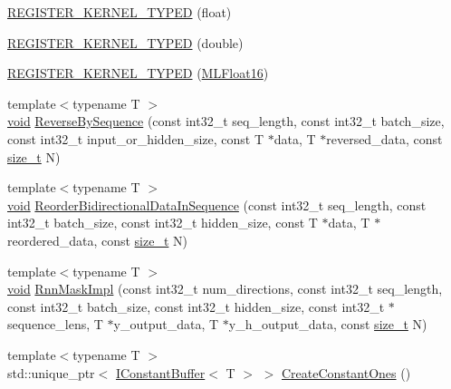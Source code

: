 \begin{DoxyCompactItemize}
\item 
\mbox{\hyperlink{namespaceonnxruntime_1_1cuda_af003050f5b8619b8e14ded14ba00da08}{R\+E\+G\+I\+S\+T\+E\+R\+\_\+\+K\+E\+R\+N\+E\+L\+\_\+\+T\+Y\+P\+ED}} (float)
\item 
\mbox{\hyperlink{namespaceonnxruntime_1_1cuda_a5d1b624b414dba6dec6a829ce2442d5a}{R\+E\+G\+I\+S\+T\+E\+R\+\_\+\+K\+E\+R\+N\+E\+L\+\_\+\+T\+Y\+P\+ED}} (double)
\item 
\mbox{\hyperlink{namespaceonnxruntime_1_1cuda_a42cc720b053b6d4b0cd5fac89629e977}{R\+E\+G\+I\+S\+T\+E\+R\+\_\+\+K\+E\+R\+N\+E\+L\+\_\+\+T\+Y\+P\+ED}} (\mbox{\hyperlink{uniononnxruntime_1_1MLFloat16}{M\+L\+Float16}})
\item 
{\footnotesize template$<$typename T $>$ }\\\mbox{\hyperlink{mlasi_8h_a88f941d423cb2a819b70a1358982b1a6}{void}} \mbox{\hyperlink{namespaceonnxruntime_1_1cuda_a50c0e5c797779509d0ec1d12b475f238}{Reverse\+By\+Sequence}} (const int32\+\_\+t seq\+\_\+length, const int32\+\_\+t batch\+\_\+size, const int32\+\_\+t input\+\_\+or\+\_\+hidden\+\_\+size, const T $\ast$data, T $\ast$reversed\+\_\+data, const \mbox{\hyperlink{mlasi_8h_a503efbc1c6e50825320ad909366b78ab}{size\+\_\+t}} N)
\item 
{\footnotesize template$<$typename T $>$ }\\\mbox{\hyperlink{mlasi_8h_a88f941d423cb2a819b70a1358982b1a6}{void}} \mbox{\hyperlink{namespaceonnxruntime_1_1cuda_ace6d5943a8e890cfde1d3638b886fdcd}{Reorder\+Bidirectional\+Data\+In\+Sequence}} (const int32\+\_\+t seq\+\_\+length, const int32\+\_\+t batch\+\_\+size, const int32\+\_\+t hidden\+\_\+size, const T $\ast$data, T $\ast$reordered\+\_\+data, const \mbox{\hyperlink{mlasi_8h_a503efbc1c6e50825320ad909366b78ab}{size\+\_\+t}} N)
\item 
{\footnotesize template$<$typename T $>$ }\\\mbox{\hyperlink{mlasi_8h_a88f941d423cb2a819b70a1358982b1a6}{void}} \mbox{\hyperlink{namespaceonnxruntime_1_1cuda_a26415486136df0da0e096efc908ab00e}{Rnn\+Mask\+Impl}} (const int32\+\_\+t num\+\_\+directions, const int32\+\_\+t seq\+\_\+length, const int32\+\_\+t batch\+\_\+size, const int32\+\_\+t hidden\+\_\+size, const int32\+\_\+t $\ast$sequence\+\_\+lens, T $\ast$y\+\_\+output\+\_\+data, T $\ast$y\+\_\+h\+\_\+output\+\_\+data, const \mbox{\hyperlink{mlasi_8h_a503efbc1c6e50825320ad909366b78ab}{size\+\_\+t}} N)
\item 
{\footnotesize template$<$typename T $>$ }\\std\+::unique\+\_\+ptr$<$ \mbox{\hyperlink{classonnxruntime_1_1cuda_1_1IConstantBuffer}{I\+Constant\+Buffer}}$<$ T $>$ $>$ \mbox{\hyperlink{namespaceonnxruntime_1_1cuda_a855114def2d3cfc9e8f0ff2d267ff782}{Create\+Constant\+Ones}} ()

\end{DoxyCompactItemize}
